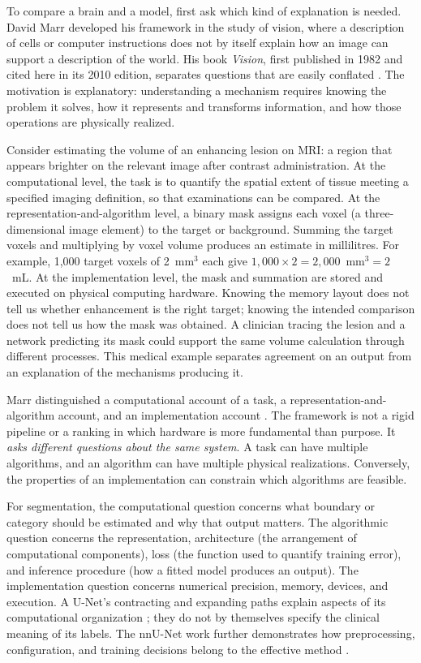 \documentclass[11pt,a4paper]{article}
\begin{document}
To compare a brain and a model, first ask which kind of explanation is needed. David Marr developed his framework in the study of vision, where a description of cells or computer instructions does not by itself explain how an image can support a description of the world. His book \emph{Vision}, first published in 1982 and cited here in its 2010 edition, separates questions that are easily conflated \citep{marr2010}. The motivation is explanatory: understanding a mechanism requires knowing the problem it solves, how it represents and transforms information, and how those operations are physically realized.

Consider estimating the volume of an enhancing lesion on MRI: a region that appears brighter on the relevant image after contrast administration. At the computational level, the task is to quantify the spatial extent of tissue meeting a specified imaging definition, so that examinations can be compared. At the representation-and-algorithm level, a binary mask assigns each voxel (a three-dimensional image element) to the target or background. Summing the target voxels and multiplying by voxel volume produces an estimate in millilitres. For example, 1,000 target voxels of 2~mm$^3$ each give $1{,}000\times2=2{,}000$~mm$^3=2$~mL. At the implementation level, the mask and summation are stored and executed on physical computing hardware. Knowing the memory layout does not tell us whether enhancement is the right target; knowing the intended comparison does not tell us how the mask was obtained. A clinician tracing the lesion and a network predicting its mask could support the same volume calculation through different processes. This medical example separates agreement on an output from an explanation of the mechanisms producing it.

Marr distinguished a computational account of a task, a representation-and-algorithm account, and an implementation account \citep{marr2010}. The framework is not a rigid pipeline or a ranking in which hardware is more fundamental than purpose. It \emph{asks different questions about the same system}. A task can have multiple algorithms, and an algorithm can have multiple physical realizations. Conversely, the properties of an implementation can constrain which algorithms are feasible.

For segmentation, the computational question concerns what boundary or category should be estimated and why that output matters. The algorithmic question concerns the representation, architecture (the arrangement of computational components), loss (the function used to quantify training error), and inference procedure (how a fitted model produces an output). The implementation question concerns numerical precision, memory, devices, and execution. A U-Net's contracting and expanding paths explain aspects of its computational organization \citep{ronneberger2015}; they do not by themselves specify the clinical meaning of its labels. The nnU-Net work further demonstrates how preprocessing, configuration, and training decisions belong to the effective method \citep{isensee2021}.
\end{document}
